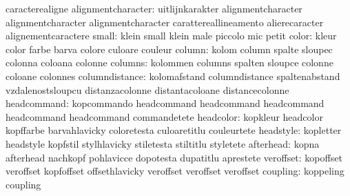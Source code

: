                            caracterealigne
       alignmentcharacter: uitlijnkarakter           alignmentcharacter
                           alignmentcharacter        alignmentcharacter
                           carattereallineamento     alierecaracter
                           alignementcaractere
                    small: klein                     small
                           klein                     male
                           piccolo                   mic
                           petit
                    color: kleur                     color
                           farbe                     barva
                           colore                    culoare
                           couleur
                   column: kolom                     column
                           spalte                    sloupec
                           colonna                   coloana
                           colonne
                  columns: kolommen                  columns
                           spalten                   sloupce
                           colonne                   coloane
                           colonnes
           columndistance: kolomafstand              columndistance
                           spaltenabstand            vzdalenostsloupcu
                           distanzacolonne           distantacoloane
                           distancecolonne
              headcommand: kopcommando               headcommand
                           headcommand               headcommand
                           headcommand               headcommand
                           commandetete
                headcolor: kopkleur                  headcolor
                           kopffarbe                 barvahlavicky
                           coloretesta               culoaretitlu
                           couleurtete
                headstyle: kopletter                 headstyle
                           kopfstil                  stylhlavicky
                           stiletesta                stiltitlu
                           styletete
                afterhead: kopna                     afterhead
                           nachkopf                  pohlavicce
                           dopotesta                 dupatitlu
                           aprestete
                veroffset: kopoffset                 veroffset
                           kopfoffset                offsethlavicky
                           veroffset                 veroffset
                           veroffset
                 coupling: koppeling                 coupling
